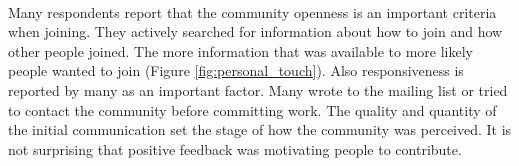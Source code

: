 \\
Many respondents report that the community openness is an important criteria when joining. They actively searched for information about how to join and how other people joined. The more information that was available to more likely people wanted to join (Figure \ref{fig:personal_touch}). Also responsiveness is reported by many as an important factor. Many wrote to the mailing list or tried to contact the community before committing work. The quality and quantity of the initial communication set the stage of how the community was perceived. It is not surprising that positive feedback was motivating people to contribute.